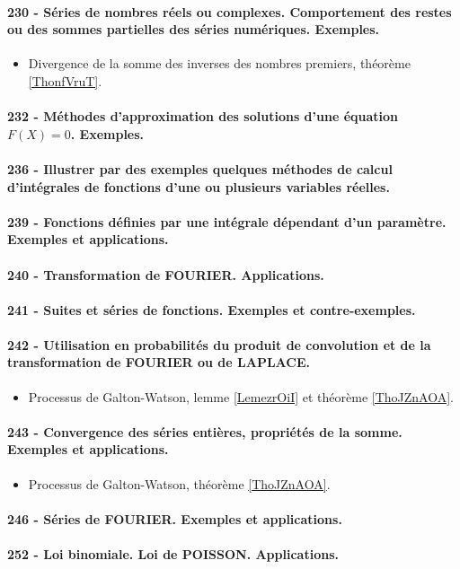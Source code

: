 \paragraph{230 - Séries de nombres réels ou complexes. Comportement des restes ou des sommes partielles des séries numériques. Exemples.}
\begin{itemize}
    \item Divergence de la somme des inverses des nombres premiers, théorème \ref{ThonfVruT}.
\end{itemize}
\paragraph{232 - Méthodes d’approximation des solutions d’une équation $F (X ) = 0$. Exemples.}
\paragraph{236 - Illustrer par des exemples quelques méthodes de calcul d’intégrales de fonctions d’une ou plusieurs variables réelles.}
\paragraph{239 - Fonctions définies par une intégrale dépendant d’un paramètre. Exemples et applications.}
\paragraph{240 - Transformation de FOURIER. Applications.}
\paragraph{241 - Suites et séries de fonctions. Exemples et contre-exemples.}
\paragraph{242 - Utilisation en probabilités du produit de convolution et de la transformation de FOURIER ou de LAPLACE.}
\begin{itemize}
    \item Processus de Galton-Watson, lemme \ref{LemezrOiI} et théorème \ref{ThoJZnAOA}.
\end{itemize}

\paragraph{243 - Convergence des séries entières, propriétés de la somme. Exemples et applications.}
\begin{itemize}
    \item Processus de Galton-Watson, théorème \ref{ThoJZnAOA}.
\end{itemize}

\paragraph{246 - Séries de FOURIER. Exemples et applications.}
\paragraph{252 - Loi binomiale. Loi de POISSON. Applications.}


